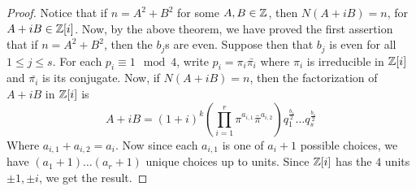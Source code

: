 \begin{proof}
  Notice that if $n=A^2+B^2$ for some  $A,B \in \mathbb{Z}$, then  $N(A+iB)=n$,
  for $A+iB \in \mathbb{Z}[i]$. Now, by the above theorem, we have proved the first
  assertion that if $n=A^2+B^2$, then the $b_j$s are even. Suppose then that
  $b_j$ is even for all  $1 \leq j \leq s$. For each  $p_i \equiv 1 \mod{4}$,
  write $p_i=\pi_i\bar{\pi_i}$ where $\pi_i$ is irreducible in $\mathbb{Z}[i]$ and
  $\bar{\pi_i}$ is its conjugate. Now, if $N(A+iB)=n$, then the factorization
  of $A+iB$ in  $\mathbb{Z}[i]$ is
  \begin{equation*}
    A+iB=(1+i)^k(\prod_{i=1}^r{\pi^{a_{i,1}}\bar{\pi}^{a_{i,2}}})
    q_1^{\frac{b_1}{2}} \dots q_s^{\frac{b_s}{2}}
  \end{equation*}
  Where $a_{i,1}+a_{i,2}=a_i$. Now since each $a_{i,1}$ is one of $a_i+1$
  possible choices, we have $(a_1+1) \dots (a_r+1)$ unique choices up to
  units. Since $\mathbb{Z}[i]$ has the $4$ units  $\pm 1, \pm i$, we get the result.
\end{proof}

